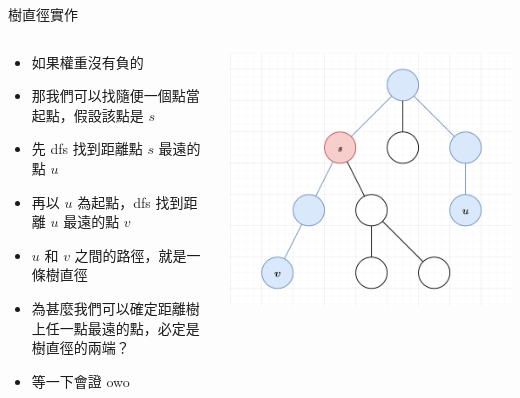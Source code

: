 \documentclass[aspectratio=169]{beamer}
\begin{document}
    \begin{frame}{樹直徑實作}
        \begin{columns}
            \begin{column}{0.6\textwidth}
                \begin{itemize}
                    \item 如果權重沒有負的
                    \item 那我們可以找隨便一個點當起點，假設該點是 $s$
                    \item<2-> 先 dfs 找到距離點 $s$ 最遠的點 $u$
                    \item<3-> 再以 $u$ 為起點，dfs 找到距離 $u$ 最遠的點 $v$
                    \item<3-> $u$ 和 $v$ 之間的路徑，就是一條樹直徑
                    \item<4-> 為甚麼我們可以確定距離樹上任一點最遠的點，必定是樹直徑的兩端？
                    \item<5-> 等一下會證 owo
                \end{itemize}
            \end{column}
            \begin{column}{0.4\textwidth}
                \begin{center}
                    \includegraphics[scale=0.3]{images/tree_diameter_dfs.png}
                \end{center}
            \end{column}
        \end{columns}
    \end{frame}
\end{document}
